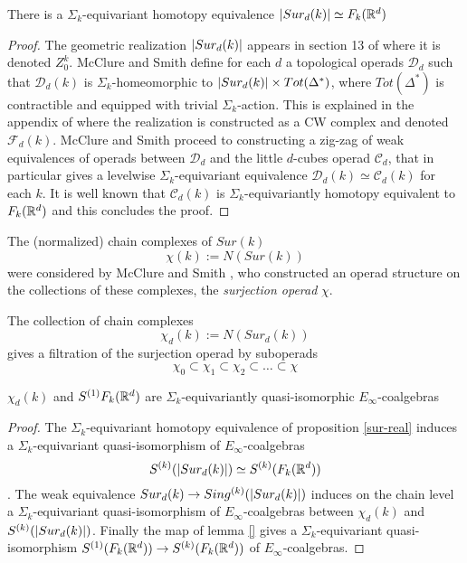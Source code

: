 
\begin{proposition} \label{sur-real}
	There is a $\Sigma_k$-equivariant homotopy equivalence
	$\lvert Sur_d(k)\rvert \simeq F_k(\mathbb{R}^d)$
\end{proposition}

\begin{proof}
	The geometric realization $\lvert Sur_d(k)\rvert$ appears in section 13 of \cite{MS} where it is denoted $Z_0^k$.
	McClure and Smith define for each $d$ a topological operads $\mathcal{D}_d$ such that $\mathcal{D}_d(k)$ is $\Sigma_k$-homeomorphic to $\lvert Sur_d(k)\rvert \times Tot(\Delta^*)$, where $Tot(\Delta^*)$ is  contractible and equipped with trivial $\Sigma_k$-action.
	This is explained in the appendix of \cite{cyclic} where the realization is constructed as a CW complex and denoted $\mathcal{F}_d(k)$.
	McClure and Smith proceed to constructing a zig-zag of weak equivalences of operads between $\mathcal{D}_d$ and the little $d$-cubes operad
	$\mathcal{C}_d$, that in particular gives a levelwise $\Sigma_k$-equivariant equivalence $\mathcal{D}_d(k) \simeq \mathcal{C}_d(k)$ for each $k$. It is well known that $\mathcal{C}_d(k)$ is $\Sigma_k$-equivariantly homotopy equivalent to $F_k(\mathbb{R}^d)$ and this concludes the proof.
\end{proof}

The (normalized) chain complexes
of $Sur(k)$  $$\chi(k):=N(Sur(k))$$
were considered by McClure and Smith
\cite{MS}, %
who constructed an operad structure
on the collections of these complexes, the {\it surjection operad} $\chi$.

The collection of chain complexes
$$\chi_d(k):=N(Sur_d(k))$$
gives a filtration of the surjection operad by suboperads
$$\chi_0 \subset \chi_1 \subset \chi_2 \subset  \dots \subset \chi$$

\begin{proposition} \label{sur-model}
	$\chi_d(k)$ and $S^{(1)}{F_k(\mathbb{R}^d)}$ are $\Sigma_k$-equivariantly quasi-isomorphic $E_\infty$-coalgebras
\end{proposition}

\begin{proof}
	The $\Sigma_k$-equivariant homotopy equivalence of proposition \ref{sur-real} induces a $\Sigma_k$-equivariant  quasi-isomorphism of $E_{\infty}$-coalgebras
	$$S^{(k)}(\lvert Sur_d(k)\rvert) \simeq S^{(k)}(F_k(\mathbb{R}^d))$$.
	The weak equivalence %
	$Sur_d(k) \to Sing^{(k)}(\lvert Sur_d(k)\rvert)$ induces on the chain level a $\Sigma_k$-equivariant  quasi-isomorphism of
	$E_\infty$-coalgebras
	between $\chi_d(k)$
	and $S^{(k)}(\lvert Sur_d(k)\rvert)$.
	Finally the map of lemma \ref{} gives a $\Sigma_k$-equivariant quasi-isomorphism $S^{(1)}(F_k(\mathbb{R}^d)) \to S^{(k)}(F_k(\mathbb{R}^d))$ of $E_\infty$-coalgebras.
\end{proof}

